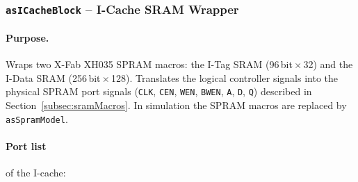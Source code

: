 \subsubsection{\texttt{asICacheBlock} -- I-Cache SRAM Wrapper}
\label{subsubsec:asICacheBlock}

\paragraph{Purpose.}
Wraps two X-Fab XH035 SPRAM macros: the I-Tag SRAM (96\,bit\,$\times$\,32)
and the I-Data SRAM (256\,bit\,$\times$\,128).
Translates the logical controller signals into the physical SPRAM port
signals (\texttt{CLK}, \texttt{CEN}, \texttt{WEN}, \texttt{BWEN},
\texttt{A}, \texttt{D}, \texttt{Q}) described in
Section~\ref{subsec:sramMacros}.
In simulation the SPRAM macros are replaced by \texttt{asSpramModel}.

\paragraph{Port list} of the I-cache:


